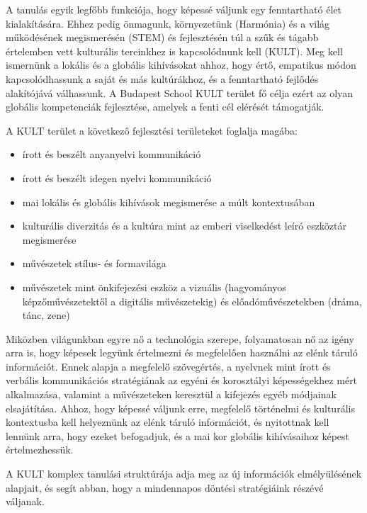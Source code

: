 A tanulás egyik legfőbb funkciója, hogy képessé váljunk egy fenntartható
élet kialakítására. Ehhez pedig önmagunk, környezetünk (Harmónia) és a
világ működésének megismerésén (STEM) és fejlesztésén túl a szűk és
tágabb értelemben vett kulturális tereinkhez is kapcsolódnunk kell
(KULT). Meg kell ismernünk a lokális és a globális kihívásokat ahhoz,
hogy értő, empatikus módon kapcsolódhassunk a saját és más kultúrákhoz,
és a fenntartható fejlődés alakítójává válhassunk. A Budapest \mbox{School}
KULT terület fő célja ezért az olyan globális kompetenciák fejlesztése,
amelyek a fenti cél elérését támogatják.

A KULT terület a következő fejlesztési területeket foglalja magába:

\begin{itemize}
\tightlist
\item
  írott és beszélt anyanyelvi kommunikáció
\item
  írott és beszélt idegen nyelvi kommunikáció
\item
  mai lokális és globális kihívások megismerése a múlt kontextusában
\item
  kulturális diverzitás és a kultúra mint az emberi viselkedést leíró
  eszköztár megismerése
\item
  művészetek stílus- és formavilága
\item
  művészetek mint önkifejezési eszköz a vizuális (hagyományos
  képzőművészetektől a digitális művészetekig) és előadóművészetekben
  (dráma, tánc, zene)
\end{itemize}

Miközben világunkban egyre nő a technológia szerepe, folyamatosan nő az
igény arra is, hogy képesek legyünk értelmezni és megfelelően használni
az elénk táruló információt. Ennek alapja a megfelelő szövegértés, a
nyelvnek mint írott és verbális kommunikációs stratégiának az egyéni és
korosztályi képességekhez mért alkalmazása, valamint a művészeteken
keresztül a kifejezés egyéb módjainak elsajátítása. Ahhoz, hogy képessé
váljunk erre, megfelelő történelmi és kulturális kontextusba kell
helyeznünk az elénk táruló információt, és nyitottnak kell lennünk arra,
hogy ezeket befogadjuk, és a mai kor globális kihívásaihoz képest
értelmezhessük.

A KULT komplex tanulási struktúrája adja meg az új információk
elmélyülésének alapjait, és segít abban, hogy a mindennapos döntési
stratégiáink részévé váljanak.

